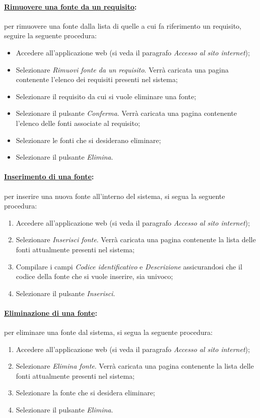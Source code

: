 \paragraph{\underline{Rimuovere una fonte da un requisito}:}
per rimuovere una fonte dalla lista di quelle a cui fa riferimento un requisito, seguire la seguente procedura:
\begin{itemize}
\item Accedere all'applicazione web (si veda il paragrafo \textit{Accesso al sito internet});
\item Selezionare \textit{Rimuovi fonte da un requisito}. Verrà caricata una pagina contenente l'elenco dei requisiti presenti nel sistema;
\item Selezionare il requisito da cui si vuole eliminare una fonte;
\item Selezionare il pulsante \textit{Conferma}. Verrà caricata una pagina contenente l'elenco delle fonti associate al requisito;
\item Selezionare le fonti che si desiderano eliminare;
\item Selezionare il pulsante \textit{Elimina}.
\end{itemize}

\paragraph{\underline{Inserimento di una fonte}:}
per inserire una nuova fonte all'interno del sistema, si segua la seguente procedura:
\begin{enumerate}
\item Accedere all'applicazione web (si veda il paragrafo \textit{Accesso al sito internet});
\item Selezionare \textit{Inserisci fonte}. Verrà caricata una pagina contenente la lista delle fonti attualmente presenti nel sistema;
\item Compilare i campi \textit{Codice identificativo} e \textit{Descrizione} assicurandosi che il codice della fonte che si vuole inserire, sia univoco;
\item Selezionare il pulsante \textit{Inserisci}. 
\end{enumerate}

\paragraph{\underline{Eliminazione di una fonte}:}
per eliminare una fonte dal sistema, si segua la seguente procedura:
\begin{enumerate}
\item Accedere all'applicazione web (si veda il paragrafo \textit{Accesso al sito internet});
\item Selezionare \textit{Elimina fonte}. Verrà caricata una pagina contenente la lista delle fonti attualmente presenti nel sistema;
\item Selezionare la fonte che si desidera eliminare;
\item Selezionare il pulsante \textit{Elimina}.
\end{enumerate}

